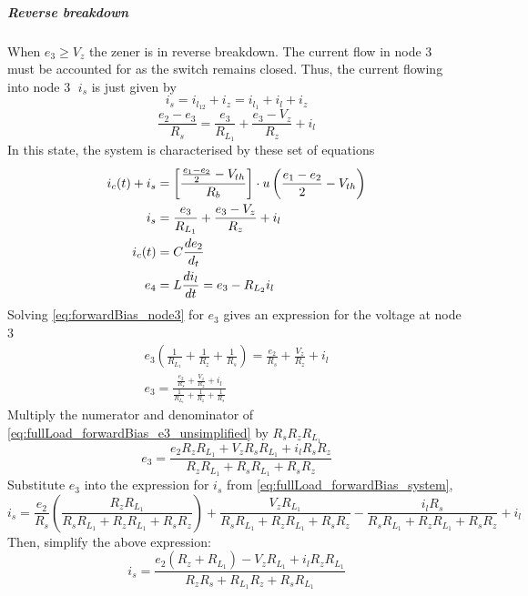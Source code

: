 \subparagraph{Reverse breakdown}
When $e_3 \geq V_z$ the zener is in reverse breakdown. The current flow in node \textcircled{3} must be accounted for as the switch remains closed. Thus, the current flowing into node \textcircled{3} $i_s$ is just given by $$i_s = i_{l_{12}} + i_z = i_{l_1} + i_l + i_z$$
\begin{equation}
	\frac{e_2 - e_3}{R_s} = \frac{e_3}{R_{L_1}} + \frac{e_3 - V_z}{R_z} + i_l
	\label{eq:forwardBias_node3}
\end{equation}
In this state, the system is characterised by these set of equations
\begin{align}
	i_c(t) + i_s &= \left[\frac{\frac{e_1 - e_2}{2} - V_{th}}{R_b} \right]\cdot u\left(\frac{e_1 - e_2}{2} - V_{th} \right) \\
	i_s &= \frac{e_3}{R_{L_1}} + \frac{e_3 - V_z}{R_z} + i_l \\
	i_c(t) &= C \frac{de_2}{d_t} \\
	e_4 &= L\frac{di_l}{dt} = e_3 - R_{L_2}i_l
	\label{eq:fullLoad_forwardBias_system}
\end{align}
Solving \eqref{eq:forwardBias_node3} for $e_3$ gives an expression for the voltage at node \textcircled{3}
\begin{equation}
\begin{split}
	e_3\left(\frac{1}{R_{L_1}} + \frac{1}{R_z} + \frac{1}{R_s}\right) = \frac{e_2}{R_s} + \frac{V_z}{R_z} + i_l \\
		e_3 = \frac{\frac{e_2}{R_s} + \frac{V_z}{R_z} + i_l}{\frac{1}{R_{L_1}} + \frac{1}{R_z} + \frac{1}{R_s}}
\end{split}
\label{eq:fullLoad_forwardBias_e3_unsimplified}
\end{equation}
Multiply the numerator and denominator of \eqref{eq:fullLoad_forwardBias_e3_unsimplified} by  $R_sR_zR_{L_1}$
\begin{equation}
 e_3 = \frac{e_2 R_z R_{L_1} + V_z R_s R_{L_1} + i_l R_s R_z}{R_z R_{L_1} + R_s R_{L_1} + R_s R_z}
\label{eq:fullLoad_forwardBias_e3}
\end{equation}
Substitute $e_3$ into the expression for $i_s$ from \eqref{eq:fullLoad_forwardBias_system},
\begin{equation}
i_s = \frac{e_2}{R_s} \left(\frac{R_z R_{L_1}}{R_s R_{L_1} + R_z R_{L_1} + R_s R_z}\right) + \frac{V_z R_{L_1}}{R_s R_{L_1} + R_z R_{L_1} + R_s R_z} - \frac{i_l R_s}{R_s R_{L_1} + R_z R_{L_1} + R_s R_z} + i_l
\end{equation}
Then, simplify the above expression:
\begin{equation}
i_s = \frac{e_2 (R_z + R_{L_1}) - V_z R_{L_1} + i_l R_z R_{L_1}}{R_z R_s + R_{L_1} R_z + R_s R_{L_1}}
\end{equation}
